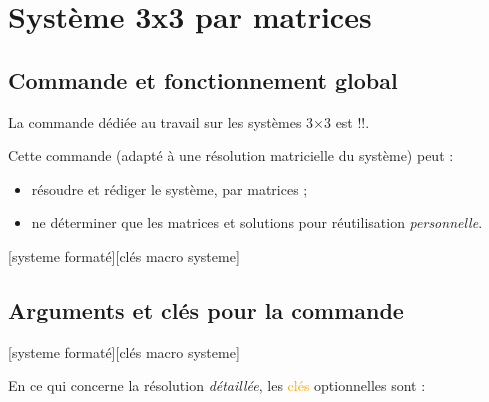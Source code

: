\documentclass[french,a4paper,11pt]{article}
\newcommand\Cle[1]{{\small\sffamily\textlangle \textcolor{orange}{#1}\textrangle}}
\begin{document}
{{\pagebreak

\section{Système 3x3 par matrices}

\subsection{Commande et fonctionnement global}

\begin{cautionblock}
La commande dédiée au travail sur les systèmes 3×3 est \motcletex!\ResolSystemeMatrices!.

Cette commande (adapté à une résolution matricielle du système) peut :

\begin{itemize}
	\item résoudre et rédiger le système, par matrices ;
	\item ne déterminer que les matrices et solutions pour réutilisation \textit{personnelle}.
\end{itemize}
\vspace*{-\baselineskip}\leavevmode
\end{cautionblock}

\begin{DemoCode}
[systeme formaté][clés macro systeme]
\end{DemoCode}

\begin{DemoCode}[]
\end{DemoCode}

\subsection{Arguments et clés pour la commande}

\begin{DemoCode}
[systeme formaté][clés macro systeme]
\end{DemoCode}

\begin{tipblock}
En ce qui concerne la résolution \textit{détaillée}, les \Cle{clés} optionnelles sont :


\end{tipblock}}}
\end{document}
